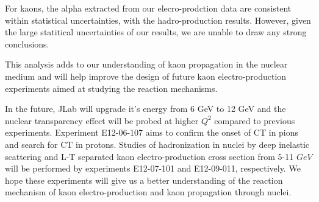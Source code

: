 For kaons,  the alpha extracted from our elecro-prodction data are consistent within statistical uncertainties, with the hadro-production results. However, given the large statitical uncertainties of our results, we are unable to draw any strong conclusions. 

This analysis adds to our understanding of kaon propagation in the nuclear medium and will help improve the design of future kaon electro-production experiments aimed at studying the reaction mechanisms.

%
In the future, JLab will upgrade it's energy from 6 GeV to 12 GeV and the nuclear transparency effect will be probed at higher $Q^2$ compared to previous experiments. Experiment E12-06-107 aims to confirm the onset of CT in pions and search for CT in protons. Studies of hadronization in nuclei by deep inelastic scattering and L-T separated kaon electro-production cross section from 5-11 $GeV$ will be performed by experiments E12-07-101 and E12-09-011, respectively. We hope these experiments will give us a better understanding of the reaction mechanism of kaon electro-production and kaon propagation through nuclei.
